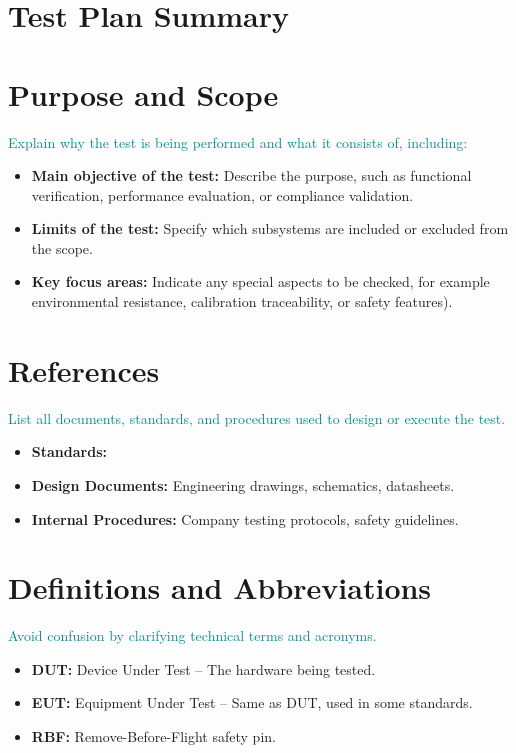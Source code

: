 \documentclass{common/latex/delta_base_styles/delta_base_styles}
\begin{document}
\makedeltaheader

\section{Test Plan Summary}
\makeversionapprovaltable

\section{Purpose and Scope}
\textcolor{DarkCyan} {Explain why the test is being performed and what it consists of, including:} 
\begin{itemize}
  \item \textbf{Main objective of the test:} Describe the purpose, such as functional verification, performance evaluation, or compliance validation.
  \item \textbf{Limits of the test:} Specify which subsystems are included or excluded from the scope.
  \item \textbf{Key focus areas:} Indicate any special aspects to be checked, for example environmental resistance, calibration traceability, or safety features).
\end{itemize}

\section{References}

\textcolor{DarkCyan} {List all documents, standards, and procedures used to design or execute the test.}
\begin{itemize}
  \item \textbf{Standards:} 
  \nocite{ISO29119,IEC60068,ISO17025} %
  \printbibliography[heading=none]
  \item \textbf{Design Documents:} Engineering drawings, schematics, datasheets.
  \item \textbf{Internal Procedures:} Company testing protocols, safety guidelines.
\end{itemize}

\section{Definitions and Abbreviations}

\textcolor{DarkCyan} {Avoid confusion by clarifying technical terms and acronyms.}
\begin{itemize}
  \item \textbf{DUT:} Device Under Test – The hardware being tested.
  \item \textbf{EUT:} Equipment Under Test – Same as DUT, used in some standards.
  \item \textbf{RBF:} Remove-Before-Flight safety pin.
\end{itemize}
\end{document}
